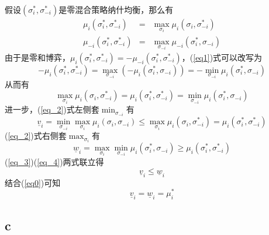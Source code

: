 \documentclass[a4paper,12pt]{ctexart}
\begin{document}
假设$(\sigma_i^*,\sigma_{-i}^*)$是零混合策略纳什均衡，那么有
\begin{eqnarray}
    \mu_i(\sigma_i^*,\sigma_{-i}^*)&=&\max_{\sigma_i}\mu_i(\sigma_i,\sigma_{-i}^*)\\
    \mu_{-i}(\sigma_i^*,\sigma_{-i}^*)&=&\max_{\sigma_{-i}}\mu_{-i}(\sigma_i^*,\sigma_{-i})\label{eq1}
\end{eqnarray}
由于是零和博弈，$\mu_i(\sigma_i^*,\sigma_{-i}^*)=-\mu_{-i}(\sigma_i^*,\sigma_{-i}^*)$，(\ref{eq1})式可以改写为
\begin{equation}
    -\mu_i(\sigma_i^*,\sigma_{-i}^*)=\max_{\sigma_{-i}}(-\mu_i(\sigma_i^*,\sigma_{-i}))=-\min_{\sigma_{-i}}\mu_i(\sigma_i^*,\sigma_{-i})
\end{equation}
从而有
\begin{equation}
    \max_{\sigma_i}\mu_i(\sigma_i,\sigma_{-i}^*)=\mu_i(\sigma_i^*,\sigma_{-i}^*)=\min_{\sigma_{-i}}\mu_i(\sigma_i^*,\sigma_{-i})\label{eq_2}
\end{equation}
进一步，(\ref{eq_2})式左侧套$\displaystyle \min_{\sigma_{-i}}$有
\begin{equation}
    \underline{v}_i=\min_{\sigma_{-i}}\max_{\sigma_i}\mu_i(\sigma_i,\sigma_{-i})\le \max_{\sigma_i}\mu_i(\sigma_i,\sigma_{-i}^*)=\mu_i(\sigma_i^*,\sigma_{-i}^*)\label{eq_3}
\end{equation}
(\ref{eq_2})式右侧套$\displaystyle \max_{\sigma_i}$有
\begin{equation}
    \underline{w}_i=\max_{\sigma_i}\min_{\sigma_{-i}}\mu_i(\sigma_i^*,\sigma_{-i})\ge \mu_i(\sigma_i^*,\sigma_{-i}^*)\label{eq_4}
\end{equation}
(\ref{eq_3})(\ref{eq_4})两式联立得
\begin{equation}
    \underline{v}_i\le\underline{w}_i
\end{equation}
结合(\ref{eq0})可知
\begin{equation}
    \underline{v}_i=\underline{w}_i=\mu_i^*\label{eq:res}
\end{equation}

\subsection{c}
\end{document}
